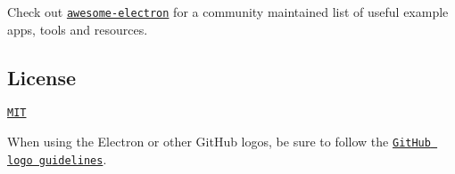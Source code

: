 Check out \href{https://github.com/sindresorhus/awesome-electron}{\tt awesome-\/electron} for a community maintained list of useful example apps, tools and resources.

\subsection*{License}

\href{https://github.com/electron/electron/blob/master/LICENSE}{\tt M\+IT}

When using the Electron or other Git\+Hub logos, be sure to follow the \href{https://github.com/logos}{\tt Git\+Hub logo guidelines}. 
